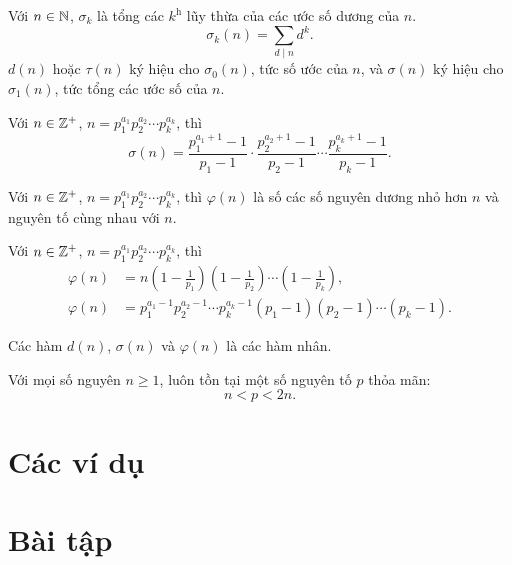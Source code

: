 \documentclass[../../imo-training-open-book.tex]{subfiles}
\begin{document}
\begin{definition*}
    \label{definition:sigma-function}
    Với $n \in \mathbb N$, $\sigma_k$ là tổng các $k^{\text{h}}$ lũy thừa của các ước số dương của $n$.  
    \[
        \sigma_k(n) = \sum_{d \mid n} d^k.
    \]
    $d(n)$ hoặc $\tau(n)$ ký hiệu cho $\sigma_0(n)$, tức số ước của $n$, và $\sigma(n)$ ký hiệu cho $\sigma_1(n)$, tức tổng các ước số của $n$.
\end{definition*}

\begin{theorem*}
    \label{theorem:sigma-function}
    Với $n \in \mathbb Z^{+}$, $n=p_1^{a_1}p_2^{a_2} \cdots p_k^{a_k}$, thì
    \[
        \sigma(n) = \frac{p_1^{a_1+1}-1}{p_1-1} \cdot \frac{p_2^{a_2+1}-1}{p_2-1} \cdots \frac{p_k^{a_k+1}-1}{p_k-1}.
    \]
\end{theorem*}

\begin{definition*}
    \label{definition:euler-totient-function}
    Với $n \in \mathbb Z^{+}$, $n=p_1^{a_1}p_2^{a_2} \cdots p_k^{a_k}$, thì
    $\varphi(n)$ là số các số nguyên dương nhỏ hơn $n$ và nguyên tố cùng nhau với $n$.
\end{definition*}

\begin{theorem*}
    \label{theorem:euler-totient-function}
    Với $n \in \mathbb Z^{+}$, $n=p_1^{a_1}p_2^{a_2} \cdots p_k^{a_k}$, thì
    \[
        \begin{aligned}
            \varphi(n) &= n\left(1-\frac{1}{p_1} \right) \left(1-\frac{1}{p_2} \right) \cdots \left(1-\frac{1}{p_k} \right),\\[1ex]
            \varphi(n) &= p_1^{a_1-1}p_2^{a_2-1} \cdots p_k^{a_k-1}(p_1-1)(p_2-1)\cdots (p_k-1).
        \end{aligned}
    \]
\end{theorem*}

\begin{lemma*}
    \label{lemma:basic-additive-functions}
    Các hàm $d(n)$, $\sigma(n)$ và $\varphi(n)$ là các hàm nhân.
\end{lemma*}

\begin{theorem}[Bổ đề Bertrand]
    \label{theorem:bertrand}
    Với mọi số nguyên \( n \geq 1 \), luôn tồn tại một số nguyên tố \( p \) thỏa mãn:
    \[
        n < p < 2n.
    \]
\end{theorem}

\newpage

\section{Các ví dụ}

 \newpage
 \newpage

\section{Bài tập}

\newpage
\end{document}
